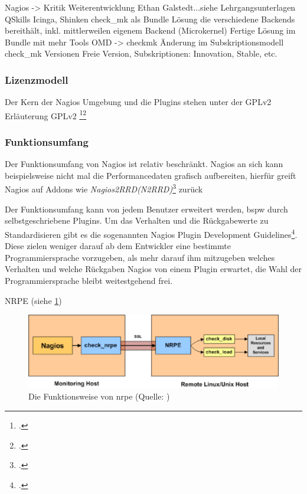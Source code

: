 \documentclass[12pt,a4paper,parskip,listof=totoc,bibliography=totoc]{scrreprt}
\begin{document}
	Nagios -> Kritik Weiterentwicklung Ethan Galstedt...siehe Lehrgangsunterlagen QSkills
	Icinga, Shinken
	check\_mk als Bundle Lösung die verschiedene Backends bereithält, inkl. mittlerweilen eigenem Backend (Microkernel)
	Fertige Lösung im Bundle mit mehr Tools
	OMD -> checkmk Änderung im Subskriptionsmodell
	check\_mk Versionen Freie Version, Subskriptionen: Innovation, Stable, etc.
	
	\subsubsection{Lizenzmodell}
	Der Kern der Nagios Umgebung und die Plugins stehen unter der GPLv2
	Erläuterung GPLv2 \footcite{gplv2de}\footcite{gplv2en}
	\subsubsection{Funktionsumfang}
	Der Funktionsumfang von Nagios ist relativ beschränkt. Nagios an sich kann beispielsweise nicht mal die Performancedaten grafisch aufbereiten, hierfür greift
	Nagios auf Addons wie \textit{Nagios2RRD(N2RRD)}\footcite{n2rrdprojecthome} zurück
	
	
	Der Funktionsumfang kann von jedem Benutzer erweitert werden, \acrlong{bspw} durch selbstgeschriebene Plugins. Um das Verhalten und die Rückgabewerte zu Standardisieren gibt es die sogenannten \glqq Nagios Plugin Development Guidelines\grqq\footcite{nagiospluginguidelines}. Diese zielen weniger darauf ab dem Entwickler eine bestimmte Programmiersprache vorzugeben, als mehr darauf ihm mitzugeben welches Verhalten und welche Rückgaben Nagios von einem Plugin erwartet, die Wahl der Programmiersprache bleibt weitestgehend frei.
	
	NRPE (siehe \ref{fig:nrpe})
	\begin{figure}[h!]
	\centering
	\includegraphics[width=1\linewidth]{pics/nrpe}
	\caption[Funktionsweise NRPE]{Die Funktionsweise von \acrlong{nrpe} (Quelle: \cite{nagioscoreaddons})}
	\label{fig:nrpe}
	\end{figure}
\end{document}
